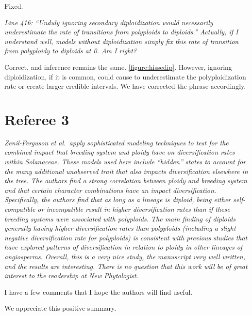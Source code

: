 \documentclass[11pt]{article}
\renewenvironment{quote}{\bigskip\noindent\itshape\ignorespaces}{\smallskip}
\begin{document}
Fixed.


\begin{quote}
Line 416: ``Unduly ignoring secondary diploidization would necessarily underestimate the rate of transitions from polyploids to diploids.''
Actually, if I understand well, models without diploidization simply fix this rate of transition from polyploidy to diploids at 0.
Am I right?
\end{quote}

Correct, and inference remains the same. \cref{figure:hissedip}. However, ignoring diploidization, if it is common, could cause to underestimate the polyploidization rate or create larger credible intervals.
We have corrected the phrase accordingly.


\section{Referee 3}
\vspace{-11pt}

\begin{quote}
Zenil-Ferguson et al.\ apply sophisticated modeling techniques to test for the combined impact that breeding system and ploidy have on diversification rates within Solanaceae.
These models used here include ``hidden'' states to account for the many additional unobserved trait that also impacts diversification elsewhere in the tree.
The authors find a strong correlation between ploidy and breeding system and that certain character combinations have an impact diversification.
Specifically, the authors find that as long as a lineage is diploid, being either self-compatible or incompatible result in higher diversification rates than if these breeding systems were associated with polyploids.
The main finding of diploids generally having higher diversification rates than polyploids (including a slight negative diversification rate for polyploids) is consistent with previous studies that have explored patterns of diversification in relation to ploidy in other lineages of angiosperms.
Overall, this is a very nice study, the manuscript very well written, and the results are interesting.
There is no question that this work will be of great interest to the readership at New Phytologist.

I have a few comments that I hope the authors will find useful.
\end{quote}

We appreciate this positive summary.
\end{document}
